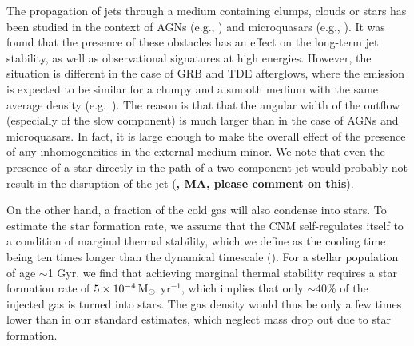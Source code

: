 \documentclass[usenatbib,fleqn]{mnras}
\newcommand{\Msun}{{\rm M_\odot}}
\begin{document}
The propagation of jets through a medium containing clumps, clouds or
stars has been studied in the context of AGNs (e.g.,
\citealt{WangWiita+2000, ChoiWiita+2007}) and microquasars (e.g.,
\citealt{Araudo+2009,Perucho+2012}). It was found that the presence of
these obstacles has an effect on the long-term jet stability, as well
as observational signatures at high energies. However, the situation
is different in the case of GRB and TDE afterglows, where the emission
is expected to be similar for a clumpy and a smooth medium with the
same average density
(e.g.~\citealt{Nakar&Granot2007,van-Eerten+2009,Mimica&Giannios2011}). The
reason is that that the angular width of the outflow (especially of
the slow component) is much larger than in the case of AGNs and
microquasars. In fact, it is large enough to make the overall effect
of the presence of any inhomogeneities in the external medium
minor. We note that even the presence of a star directly in the path
of a two-component jet would probably not result in the disruption of
the jet ({\bf, MA, please comment on this}).

On the other hand, a fraction of the cold gas will also condense into
stars.  To estimate the star formation rate, we assume that the CNM
self-regulates itself to a condition of marginal thermal stability,
which we define as the cooling time being ten times longer than the
dynamical timescale (\citealt{McCourt+2012}). For a stellar population
of age $\sim$1 Gyr, we find that achieving marginal thermal stability
requires a star formation rate of $5\times 10^{-4} \,\Msun$ yr$^{-1}$,
which implies that only $\sim 40$\% of the injected gas is turned into
stars.  The gas density would thus be only a few times lower than in
our standard estimates, which neglect mass drop out due to star
formation.
\end{document}
